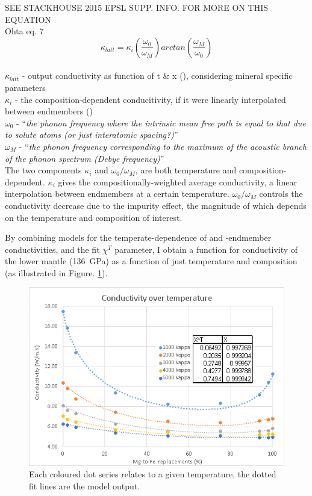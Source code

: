 SEE STACKHOUSE 2015 EPSL SUPP. INFO. FOR MORE ON THIS EQUATION
\\
Ohta eq. 7 
\begin{equation}%
\kappa_{latt}=\kappa_{i}\left ( \frac{\omega_{0}}{\omega_{M}} \right )arctan\left ( \frac{\omega_{M}}{\omega_{0}} \right )
\label{eq.ohta7}
\end{equation}%
\\ $\kappa_{latt}$ - output conductivity as function of t \& x (\wmk), considering mineral specific parameters\\
$\kappa_{i}$ - the composition-dependent conducitivity, if it were linearly interpolated between endmembers (\wmk)\\
$\omega_{0}$ - \enquote{\textit{the phonon frequency where the intrinsic mean free path is equal to that due to solute atoms (or just interatomic spacing?)}}\\
$\omega_{M}$ - \enquote{\textit{the phonon frequency corresponding to the maximum of the acoustic branch of the phonon spectrum (Debye frequency)}}\\

The two components $\kappa_{i}$ and $\omega_{0}/\omega_{M}$, are both temperature and composition-dependent. $\kappa_{i}$ gives the compositionally-weighted average conductivity, a linear interpolation between endmembers at a certain temperature. $\omega_{0}/\omega_{M}$ controls the conductivity decrease due to the impurity effect, the magnitude of which depends on the temperature and composition of interest.

By combining models for the temperate-dependence of \mgsios and \fesio-endmember conductivities, and the fit $\chi^{T}$ parameter, I obtain a function for conductivity of the lower mantle (136~GPa) as a function of just temperature and composition (as illustrated in Figure. \ref{fig:draft_kc}).\\

\begin{figure}[h]
  \includegraphics[width=\linewidth]{Figures/draft_kC.png}
  \caption{Each coloured dot series relates to a given temperature, the dotted fit lines are the model output.}
  \label{fig:draft_kc}
\end{figure}

